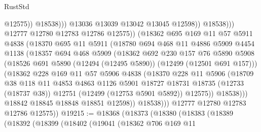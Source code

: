 \begin{lexlean}{RustStd}
\begin{coremodule}
                                    @12575))
                                @18538)))
                          @13036
                          @13039
                          @13042
                          @13045
                          @12598))
                      @18538)))
                @12777
                @12780
                @12783
                @12786
                @12575))
            (@18362
              @695
              @169
              @11
              @57
              @5911
              @4838
              (@18370
                @695
                @11
                @5911
                (@18780
                  @694
                  @468
                  @11
                  @4886
                  @5909
                  @4454
                  @1138
                  (@18357
                    @694
                    @468
                    @5909
                    (@18362
                      @692
                      @230
                      @157
                      @76
                      @5890
                      @5908
                      (@18526 @691 @5890 (@12494 (@12495 @5890)) (@12499 (@12501 @691 @157)))
                      (@18362
                        @228
                        @169
                        @11
                        @57
                        @5906
                        @4838
                        (@18370
                          @228
                          @11
                          @5906
                          (@18709
                            @38
                            @118
                            @11
                            @4853
                            @4863
                            @1126
                            @5901
                            @18727
                            @18731
                            @18735
                            (@12733 (@18737 @38))
                            @12751
                            (@12499 (@12753 @5901 @5892))
                            @12575))
                        @18538)))
                  @18842
                  @18845
                  @18848
                  @18851
                  @12598))
              @18538)))
        @12777
        @12780
        @12783
        @12786
        @12575))
@19215 := @18368
    (@18373
      (@18380
        (@18383
          (@18389
            (@18392
              (@18399
                (@18402
                  (@19041
                    (@18362
                      @706
                      @169
                      @11

\end{coremodule}
\end{lexlean}
